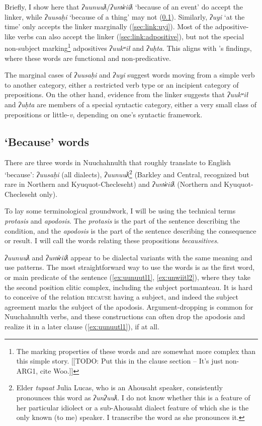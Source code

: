Briefly, I show here that \textit{ʔuunuuƛ}/\textit{ʔunw̓iiƛ} `because of an event' do accept the linker, while \textit{ʔuusaḥi} `because of a thing' may not (\ref{sec:link:because}). Similarly, \textit{ʔuyi} `at the time' only accepts the linker marginally (\ref{sec:link:uyi}). Most of the adpositive-like verbs can also accept the linker (\ref{sec:link:adpositive}), but not the special non-subject marking\footnote{The marking properties of these words and are somewhat more complex than this simple story. [[TODO: Put this in the clause section -- It's just non-ARG1, cite Woo.]]} adpositives \textit{ʔuukʷił} and \textit{ʔuḥta}. This aligns with \citeauthor{woo2007b}'s findings, where these words are functional and non-predicative.

The marginal cases of \textit{ʔuusaḥi} and \textit{ʔuyi} suggest words moving from a simple verb to another category, either a restricted verb type or an incipient category of prepositions. On the other hand, evidence from the linker suggests that \textit{ʔuukʷił} and \textit{ʔuḥta} are members of a special syntactic category, either a very small class of prepositions or little-\textit{v}, depending on one's syntactic framework.

\subsection{`Because' words} \label{sec:link:because}

There are three words in Nuuchahnulth that roughly translate to English `because': \textit{ʔuusaḥi} (all dialects), \textit{ʔuunuuƛ}\footnote{Elder \textit{tupaat} Julia Lucas, who is an Ahousaht speaker, consistently pronounces this word as \textit{ʔunʔuuƛ}. I do not know whether this is a feature of her particular idiolect or a sub-Ahousaht dialect feature of which she is the only known (to me) speaker. I transcribe the word as she pronounces it.} (Barkley and Central, recognized but rare in Northern and Kyuquot-Checleseht) and \textit{ʔunw̓iiƛ} (Northern and Kyuquot-Checleseht only).

To lay some terminological groundwork, I will be using the technical terms \textit{protasis} and \textit{apodosis}. The \textit{protasis} is the part of the sentence describing the condition, and the \textit{apodosis} is the part of the sentence describing the consequence or result. I will call the words relating these propositions \textit{becausitives}.

\textit{ʔuunuuƛ} and \textit{ʔunw̓iiƛ} appear to be dialectal variants with the same meaning and use patterns. The most straightforward way to use the words is as the first word, or main predicate of the sentence (\ref{ex:uunuutl1}, \ref{ex:unwiitl2}), where they take the second position clitic complex, including the subject portmanteau. It is hard to conceive of the relation \textsc{because} having a subject, and indeed the subject agreement marks the subject of the apodosis. Argument-dropping is common for Nuuchahnulth verbs, and these constructions can often drop the apodosis and realize it in a later clause (\ref{ex:uunuutl1}), if at all.

